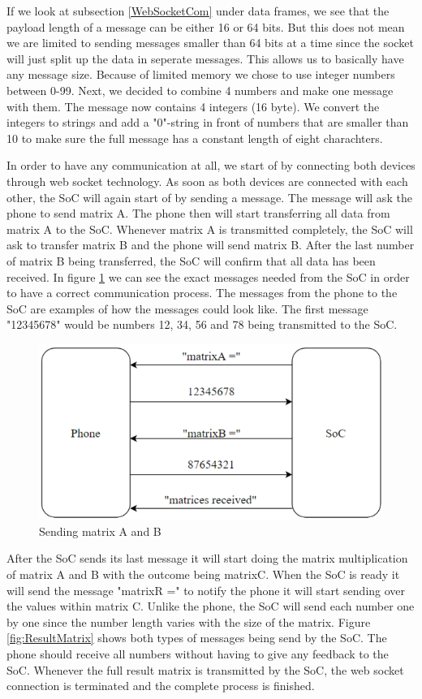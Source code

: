 \documentclass[a4paper, 11pt]{report}
\begin{document}
If we look at subsection \ref{WebSocketCom} under data frames, we see that the payload length of a message can be either 16 or 64 bits. But this does not mean we are limited to sending messages smaller than 64 bits at a time since the socket will just split up the data in seperate messages. This allows us to basically have any message size. Because of limited memory we chose to use integer numbers between 0-99. Next, we decided to combine 4 numbers and make one message with them. The message now contains 4 integers (16 byte). We convert the integers to strings and add a "0"-string in front of numbers that are smaller than 10 to make sure the full message has a constant length of eight charachters.

In order to have any communication at all, we start of by connecting both devices through web socket technology. As soon as both devices are connected with each other, the SoC will again start of by sending a message. The message will ask the phone to send matrix A. The phone then will start transferring all data from matrix A to the SoC. Whenever matrix A is transmitted completely, the SoC will ask to transfer matrix B and the phone will send matrix B. After the last number of matrix B being transferred, the SoC will confirm that all data has been received. In figure \ref{fig:Matrices} we can see the exact messages needed from the SoC in order to have a correct communication process. The messages from the phone to the SoC are examples of how the messages could look like. The first message "12345678" would be numbers 12, 34, 56 and 78 being transmitted to the SoC.

\begin{figure}[ht]
\centering
\includegraphics[scale=0.7]{images/webSocketCom.pdf}
\caption{Sending matrix A and B}\label{fig:Matrices}
\end{figure}

After the SoC sends its last message it will start doing the matrix multiplication of matrix A and B with the outcome being matrixC. When the SoC is ready it will send the message "matrixR =" to notify the phone it will start sending over the values within matrix C. Unlike the phone, the SoC will send each number one by one since the number length varies with the size of the matrix. Figure \ref{fig:ResultMatrix} shows both types of messages being send by the SoC. The phone should receive all numbers without having to give any feedback to the SoC. Whenever the full result matrix is transmitted by the SoC, the web socket connection is terminated and the complete process is finished.
\end{document}
